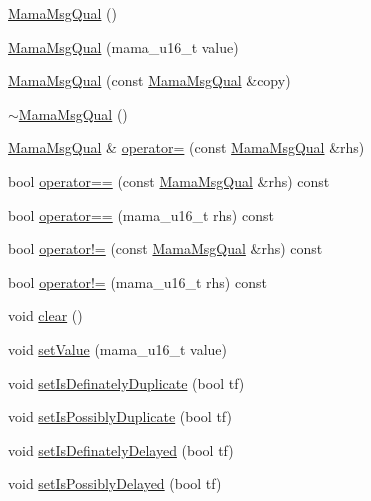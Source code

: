 \begin{DoxyCompactItemize}
\item 
\hyperlink{classWombat_1_1MamaMsgQual_add6d8160f22e2ae74b0c415e0fdf7649}{MamaMsgQual} ()
\item 
\hyperlink{classWombat_1_1MamaMsgQual_a6e15a296b1b0f4cbef6b94c9dcf752d6}{MamaMsgQual} (mama\_\-u16\_\-t value)
\item 
\hyperlink{classWombat_1_1MamaMsgQual_a204acf9fa97acdbef0098cb716fa0da0}{MamaMsgQual} (const \hyperlink{classWombat_1_1MamaMsgQual}{MamaMsgQual} \&copy)
\item 
\hyperlink{classWombat_1_1MamaMsgQual_aa6518b71ae8d44fb30f7d2d2fb985df2}{$\sim$MamaMsgQual} ()
\item 
\hyperlink{classWombat_1_1MamaMsgQual}{MamaMsgQual} \& \hyperlink{classWombat_1_1MamaMsgQual_a41c08d70ac1051df0718120b26671b90}{operator=} (const \hyperlink{classWombat_1_1MamaMsgQual}{MamaMsgQual} \&rhs)
\item 
bool \hyperlink{classWombat_1_1MamaMsgQual_a673126e2c79f9dbb2f4334182218f9fe}{operator==} (const \hyperlink{classWombat_1_1MamaMsgQual}{MamaMsgQual} \&rhs) const 
\item 
bool \hyperlink{classWombat_1_1MamaMsgQual_afa761f4ed9ed2b2bd33be92969c31920}{operator==} (mama\_\-u16\_\-t rhs) const 
\item 
bool \hyperlink{classWombat_1_1MamaMsgQual_abf7019cb1c95421816e3b31791657579}{operator!=} (const \hyperlink{classWombat_1_1MamaMsgQual}{MamaMsgQual} \&rhs) const 
\item 
bool \hyperlink{classWombat_1_1MamaMsgQual_a9f972264728cb00e2ee69ec12c5f3022}{operator!=} (mama\_\-u16\_\-t rhs) const 
\item 
void \hyperlink{classWombat_1_1MamaMsgQual_a88234633f34557311d4fdd3554a1b10d}{clear} ()
\item 
void \hyperlink{classWombat_1_1MamaMsgQual_ab2db46e3928e4e964ac24030b52a8539}{setValue} (mama\_\-u16\_\-t value)
\item 
void \hyperlink{classWombat_1_1MamaMsgQual_a6a0e738d4e6ad9eb6346fb49cc4c6eb6}{setIsDefinatelyDuplicate} (bool tf)
\item 
void \hyperlink{classWombat_1_1MamaMsgQual_aee0b5012d3ed45fa27c6d00f20f533d2}{setIsPossiblyDuplicate} (bool tf)
\item 
void \hyperlink{classWombat_1_1MamaMsgQual_aac859f1f88c3b32c799c31d010d70c7a}{setIsDefinatelyDelayed} (bool tf)
\item 
void \hyperlink{classWombat_1_1MamaMsgQual_a19b744e573c3920eb43a4e7b3e51e7ae}{setIsPossiblyDelayed} (bool tf)

\end{DoxyCompactItemize}
